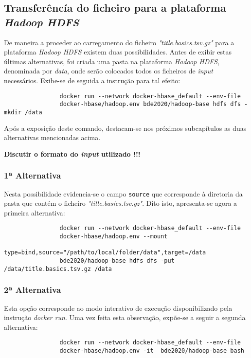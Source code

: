 \documentclass[a4paper]{report}
\begin{document}
{		\subsection{Transferêncía do ficheiro para a plataforma \textit{Hadoop HDFS}} \label{job1-2}
		De maneira a proceder ao carregamento do ficheiro \textit{"title.basics.tsv.gz"} para a plataforma \textit{Hadoop HDFS} existem duas possibilidades. Antes de exibir estas últimas alternativas, foi criada uma pasta na plataforma \textit{Hadoop HDFS}, denominada por \textit{data}, onde serão colocados todos os ficheiros de \textit{input} necessários. Exibe-se de seguida a instrução para tal efeito:
		{
			\color{teal}
			\begin{verbatim}
			    docker run --network docker-hbase_default --env-file 
			    docker-hbase/hadoop.env bde2020/hadoop-base hdfs dfs -mkdir /data
			\end{verbatim}
		}

		Após a exposição deste comando, destacam-se nos próximos subcapítulos as duas alternativas mencionadas acima.

		{
			\color{red}
			\textbf{Discutir o formato do \textit{input} utilizado !!!}
		}
		\subsubsection{1ª Alternativa}
		Nesta possibilidade evidencia-se o campo \texttt{source} que corresponde à diretoria da pasta que contém o ficheiro \textit{"title.basics.tsv.gz"}.
		Dito isto, apresenta-se agora a primeira alternativa:
		{
			\color{teal}
			\begin{verbatim}
			    docker run --network docker-hbase_default --env-file
			    docker-hbase/hadoop.env --mount 
			    type=bind,source="/path/to/local/folder/data",target=/data
			    bde2020/hadoop-base hdfs dfs -put /data/title.basics.tsv.gz /data
			\end{verbatim}
		}

		\subsubsection{2ª Alternativa}
		Esta opção corresponde ao modo interativo de execução disponibilizado pela instrução \textit{docker run}.
		Uma vez feita esta observação, expõe-se a seguir a segunda alternativa:
		{
			\color{teal}
			\begin{verbatim}
			    docker run --network docker-hbase_default --env-file
			    docker-hbase/hadoop.env -it  bde2020/hadoop-base bash


\end{verbatim}}}
\end{document}
